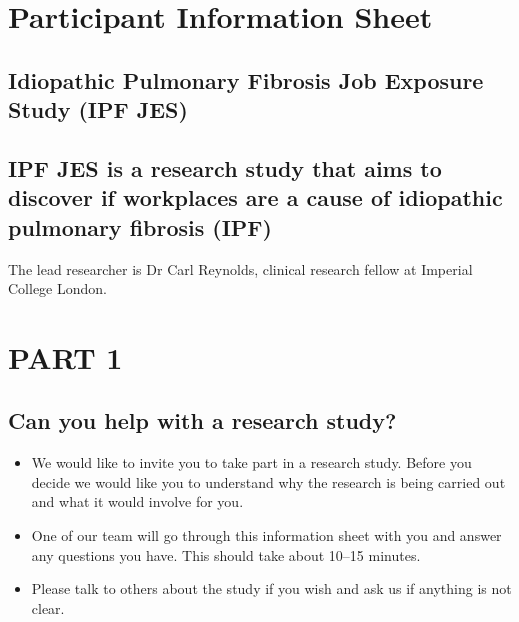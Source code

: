 \documentclass[a4paper,10pt]{article}
\date{}
\begin{document}
\pagestyle{fancy} 





\section*{Participant Information Sheet}

\subsection*{Idiopathic Pulmonary Fibrosis Job Exposure Study (IPF JES)}
\subsection*{IPF JES is a research study that aims to discover if workplaces are a cause of idiopathic pulmonary fibrosis (IPF)}

The lead researcher is Dr Carl Reynolds, clinical research fellow at Imperial College London.

\section*{PART 1}
\subsection*{Can you help with a research study?}

 \begin{itemize} 
 \item We would like to invite you to take part in a research study. Before you decide we would like you to understand why the research is being carried out and what it would involve for you.  
 \item One of our team will go through this information sheet with you and answer any questions you have. This should take about 10--15 minutes.
 \item Please talk to others about the study if you wish and ask us if anything is not clear.
 \end{itemize} 
\end{document}
